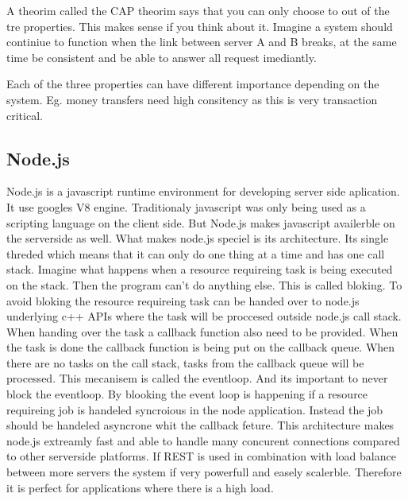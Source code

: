 \documentclass[a4paper,12pt,english]{article}
\begin{document}
 A theorim called the CAP theorim says that you can only choose to out of the
 tre properties. This makes sense if you think about it. Imagine a system
 should continiue to function when the link between server A and B breaks, at
 the same time be consistent and be able to answer all request imediantly.
 
Each of the three properties can have different importance depending on the
system. Eg. money transfers need high consitency as this is very transaction
critical.

\subsection{Node.js}
Node.js is a javascript runtime environment for developing server side
aplication. It use googles V8 engine. Traditionaly javascript was only being
used as a scripting language on the client side. But Node.js makes javascript
availerble on the serverside as well. What makes node.js speciel is its
architecture. Its single threded which means that it can only do one thing
at a time and has one call stack. Imagine what happens when a resource
requireing task is being executed on the stack. Then the program can't do
anything else. This is called bloking. To avoid bloking the resource requireing
task can be handed over to node.js underlying c++ APIs where the task will be
proccesed outside node.js call stack. When handing over the task a callback
function also need to be provided. When the task is done the callback function
is being put on the callback queue. When there are no tasks on the call
stack, tasks from the callback queue will be processed. This mecanisem is
called the eventloop. And its important to never block the eventloop. By
blooking the event loop is happening if a resource requireing job is
handeled syncroious in the node application. Instead the job should be
handeled asyncrone whit the callback feture. This architecture makes node.js
extreamly fast and able to handle many concurent connections compared to other
serverside platforms. If REST is used in combination with load balance between
more servers the system if very powerfull and easely scalerble. Therefore it is
perfect for applications where there is a high load.
\end{document}
